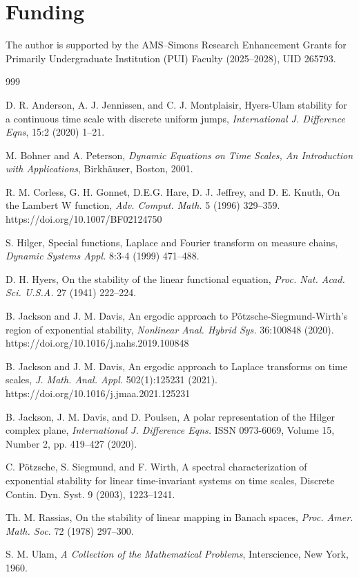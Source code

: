 \documentclass[12pt,reqno]{amsart}
\theoremstyle{plain}
\theoremstyle{definition}
\numberwithin{equation}{section}
\numberwithin{theorem}{section}
\begin{document}
\section*{Funding}
The author is supported by the AMS--Simons Research Enhancement Grants for Primarily Undergraduate Institution (PUI) Faculty (2025--2028), UID 265793.


\begin{thebibliography}{999}

 D. R. Anderson,  A. J. Jennissen, and C. J. Montplaisir,
Hyers-Ulam stability for a continuous time scale with discrete uniform jumps,
\emph{International J. Difference Eqns}, 15:2 (2020) 1--21. 

 M. Bohner and A. Peterson, 
\emph{Dynamic Equations on Time Scales, An Introduction with Applications}, Birkh\"auser, Boston, 2001.

 R. M. Corless, G. H. Gonnet, D.E.G. Hare, D. J. Jeffrey, and D. E. Knuth, On the Lambert W function,
\emph{Adv. Comput. Math.} 5 (1996) 329--359. https://doi.org/10.1007/BF02124750

 S. Hilger, Special functions, Laplace and Fourier transform on measure chains, 
\emph{Dynamic Systems Appl.} 8:3-4 (1999) 471--488.

 D. H. Hyers, 
On the stability of the linear functional equation, 
\emph{Proc. Nat. Acad. Sci. U.S.A.} 27 (1941) 222--224.

 B. Jackson and J. M. Davis,
An ergodic approach to P\"{o}tzsche-Siegmund-Wirth's region of exponential stability, \emph{Nonlinear Anal. Hybrid Sys.} 36:100848 (2020).
https://doi.org/10.1016/j.nahs.2019.100848
		
 B. Jackson and J. M. Davis,
An ergodic approach to Laplace transforms on time scales, \emph{J. Math. Anal. Appl.}  502(1):125231 (2021).
https://doi.org/10.1016/j.jmaa.2021.125231

 B. Jackson, J. M. Davis, and D. Poulsen,
A polar representation of the Hilger complex plane,
\emph{International J. Difference Eqns.} ISSN 0973-6069, Volume 15, Number 2, pp. 419--427 (2020).

 C. P\"{o}tzsche, S. Siegmund, and F. Wirth, A spectral characterization of exponential stability for linear time-invariant
systems on time scales, Discrete Contin. Dyn. Syst. 9 (2003), 1223--1241.

 Th. M. Rassias, 
On the stability of linear mapping in Banach spaces, 
\emph{Proc. Amer. Math. Soc.} 72 (1978) 297--300.

 S. M. Ulam, 
\emph{A Collection of the Mathematical Problems}, Interscience, New York, 1960.

\end{thebibliography}
\label{lastpage}
\end{document}

